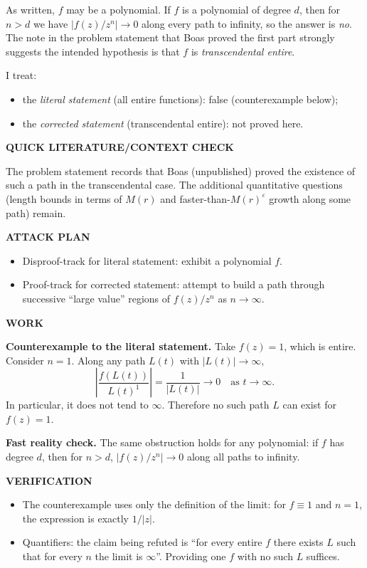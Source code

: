 \medskip
As written, $f$ may be a polynomial. If $f$ is a polynomial of degree $d$, then for $n>d$ we have $|f(z)/z^n|\to 0$ along every path to infinity, so the answer is \emph{no}. The note in the problem statement that Boas proved the first part strongly suggests the intended hypothesis is that $f$ is \emph{transcendental entire}.

I treat:
\begin{itemize}
\item the \emph{literal statement} (all entire functions): false (counterexample below);
\item the \emph{corrected statement} (transcendental entire): not proved here.
\end{itemize}

\medskip
\noindent\textbf{QUICK LITERATURE/CONTEXT CHECK}

The problem statement records that Boas (unpublished) proved the existence of such a path in the transcendental case. The additional quantitative questions (length bounds in terms of $M(r)$ and faster-than-$M(r)^\varepsilon$ growth along some path) remain.

\medskip
\noindent\textbf{ATTACK PLAN}

\begin{itemize}
\item Disproof-track for literal statement: exhibit a polynomial $f$.
\item Proof-track for corrected statement: attempt to build a path through successive ``large value'' regions of $f(z)/z^n$ as $n\to\infty$.
\end{itemize}

\medskip
\noindent\textbf{WORK}

\noindent\textbf{Counterexample to the literal statement.}
Take $f(z)=1$, which is entire. Consider $n=1$. Along any path $L(t)$ with $|L(t)|\to\infty$,
\[
\left|\frac{f(L(t))}{L(t)^1}\right| = \frac{1}{|L(t)|}\to 0
\quad\text{as }t\to\infty.
\]
In particular, it does not tend to $\infty$. Therefore no such path $L$ can exist for $f(z)=1$.

\medskip
\noindent\textbf{Fast reality check.}
The same obstruction holds for any polynomial: if $f$ has degree $d$, then for $n>d$, $|f(z)/z^n|\to 0$ along all paths to infinity.

\medskip
\noindent\textbf{VERIFICATION}

\begin{itemize}
\item The counterexample uses only the definition of the limit: for $f\equiv 1$ and $n=1$, the expression is exactly $1/|z|$.
\item Quantifiers: the claim being refuted is ``for every entire $f$ there exists $L$ such that for every $n$ the limit is $\infty$''. Providing one $f$ with no such $L$ suffices.
\end{itemize}

